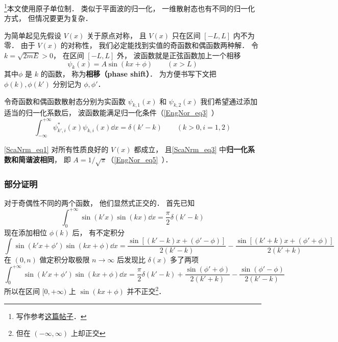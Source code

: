 
\footnote{写作参考\href{https://chaoli.club/index.php/4541/last}{这篇帖子}．}本文使用原子单位制． 类似于平面波的归一化， 一维散射态也有不同的归一化方式， 但情况要更为复杂． 

为简单起见先假设 $V(x)$ 关于原点对称， 且 $V(x)$ 只在区间 $[-L,L]$ 内不为零． 由于 $V(x)$ 的对称性， 我们必定能找到实值的奇函数和偶函数两种解． 令 $k = \sqrt{2mE} > 0$， 在区间 $[-L,L]$ 外， 波函数就是正弦函数加上一个相移
\begin{equation}\label{ScaNrm_eq3}
\psi_k(x) = A\sin(kx + \phi) \qquad (x > L)
\end{equation}
其中$\phi$ 是 $k$ 的函数， 称为\textbf{相移（phase shift）}． 为方便书写下文把 $\phi(k),\phi(k')$ 分别记为 $\phi, \phi'$．

令奇函数和偶函数散射态分别为实函数 $\psi_{k,1}(x)$ 和 $\psi_{k,2}(x)$ 我们希望通过添加适当的归一化系数后， 波函数能满足归一化条件（\autoref{EngNor_eq3}~）
\begin{equation}\label{ScaNrm_eq1}
\int_{-\infty}^{+\infty} \psi_{k',i}^*(x) \psi_{k,i}(x) \dd{x} = \delta(k' - k) \qquad (k > 0, i = 1, 2)
\end{equation}

\begin{theorem}{}
\autoref{ScaNrm_eq1} 对所有性质良好的 $V(x)$ 都成立， 且\autoref{ScaNrm_eq3} 中\textbf{归一化系数和简谐波相同}， 即 $A = 1/\sqrt{\pi}$（\autoref{EngNor_eq5}~）．
\end{theorem}

\subsubsection{部分证明}
对于奇偶性不同的两个函数， 他们显然式正交的． 首先已知
\begin{equation}
\int_{0}^{+\infty} \sin(k'x)\sin(kx)\dd{x} = \frac{\pi}{2}\delta(k'-k)
\end{equation}
现在添加相位 $\phi(k)$ 后， 有不定积分
\begin{equation}
\int \sin(k'x+\phi')\sin(kx+\phi) \dd{x} = \frac{\sin[(k'-k)x + (\phi'-\phi)]}{2(k'-k)}
- \frac{\sin[(k'+k)x+(\phi'+\phi)]}{2(k'+k)}
\end{equation}
在 $(0,n)$ 做定积分取极限 $n\to\infty$ 后发现比 $\delta(x)$ 多了两项
\begin{equation}
\int_{0}^{+\infty} \sin(k'x+\phi')\sin(kx+\phi) \dd{x} = \frac{\pi}{2}\delta(k'-k)
+ \frac{\sin(\phi'+\phi)}{2(k'+k)} - \frac{\sin(\phi'-\phi)}{2(k'-k)}
\end{equation}
所以在区间 $[0, +\infty)$ 上 $\sin(kx+\phi)$ 并不正交\footnote{但在 $(-\infty,\infty)$ 上却正交}．

